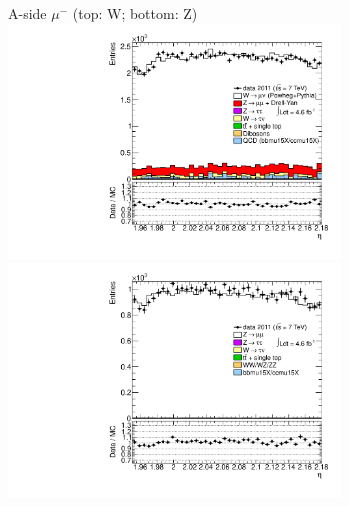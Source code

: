 {{
A-side $\mu^{-}$ (top: W; bottom: Z)
\centering
\includegraphics[width=0.66\textwidth]{dates/20130306/figures/etaphi/WpLtoL_10_A_stack_l_eta_NEG} \\
\includegraphics[width=0.66\textwidth]{dates/20130306/figures/etaphi/Z_10_A_stack_lN_eta_ALL.pdf} 

\cole
}



 {
\colb[T]

}}
